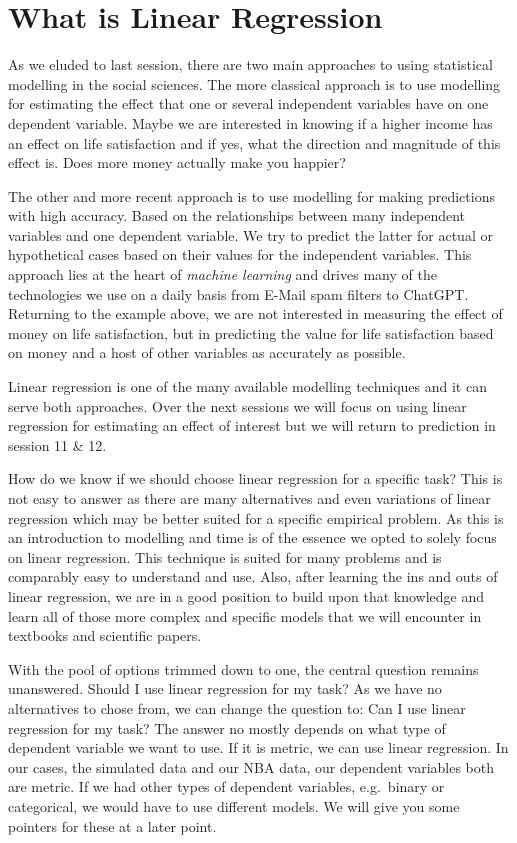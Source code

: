 \documentclass[
]{book}
\begin{document}
\hypertarget{what-is-linear-regression}{%
\section{What is Linear Regression}\label{what-is-linear-regression}}

As we eluded to last session, there are two main approaches to using
statistical modelling in the social sciences.
The more classical approach is to use modelling for estimating the effect that
one or several independent variables have on one dependent variable. Maybe we
are interested in knowing if a higher income has an effect on life satisfaction
and if yes, what the direction and magnitude of this effect is. Does more money
actually make you happier?

The other and more recent approach is to use modelling for making predictions
with high accuracy. Based on the relationships between many independent
variables and one dependent variable. We try to predict the latter for actual
or hypothetical cases based on their values for the independent variables.
This approach lies at the heart of \emph{machine learning} and drives many of the
technologies we use on a daily basis from E-Mail spam filters to ChatGPT.
Returning to the example above, we are not interested in measuring the effect
of money on life satisfaction, but in predicting the value for life satisfaction
based on money and a host of other variables as accurately as possible.

Linear regression is one of the many available modelling techniques and it can
serve both approaches. Over the next sessions we will focus on using
linear regression for estimating an effect of interest but we will return to
prediction in session 11 \& 12.

How do we know if we should choose linear regression for a specific task?
This is not easy to answer as there are many alternatives and even variations of
linear regression which may be better suited for a specific empirical problem.
As this is an introduction to modelling and time is of the essence we opted to
solely focus on linear regression. This technique is suited for many problems and
is comparably easy to understand and use. Also, after learning the ins and outs
of linear regression, we are in a good position to build upon that knowledge and
learn all of those more complex and specific models that we will encounter in
textbooks and scientific papers.

With the pool of options trimmed down to one, the central question remains unanswered.
Should I use linear regression for my task? As we have no alternatives to chose
from, we can change the question to: Can I use linear regression for my task?
The answer no mostly depends on what type of dependent variable we want to use.
If it is metric, we can use linear regression. In our cases, the simulated data
and our NBA data, our dependent variables both are metric. If we had other types
of dependent variables, e.g.~binary or categorical, we would have to use different
models. We will give you some pointers for these at a later point.
\end{document}
